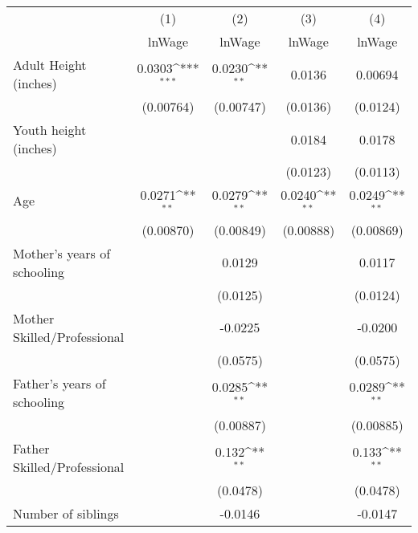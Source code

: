 {
\def\sym#1{\ifmmode^{#1}\else\(^{#1}\)\fi}
\begin{tabular}{l*{4}{c}}
\hline\hline
            &\multicolumn{1}{c}{(1)}&\multicolumn{1}{c}{(2)}&\multicolumn{1}{c}{(3)}&\multicolumn{1}{c}{(4)}\\
            &\multicolumn{1}{c}{lnWage}&\multicolumn{1}{c}{lnWage}&\multicolumn{1}{c}{lnWage}&\multicolumn{1}{c}{lnWage}\\
\hline
Adult Height (inches)&      0.0303\sym{***}&      0.0230\sym{**} &      0.0136         &     0.00694         \\
            &   (0.00764)         &   (0.00747)         &    (0.0136)         &    (0.0124)         \\
[1em]
Youth height (inches)&                     &                     &      0.0184         &      0.0178         \\
            &                     &                     &    (0.0123)         &    (0.0113)         \\
[1em]
Age         &      0.0271\sym{**} &      0.0279\sym{**} &      0.0240\sym{**} &      0.0249\sym{**} \\
            &   (0.00870)         &   (0.00849)         &   (0.00888)         &   (0.00869)         \\
[1em]
Mother's years of schooling&                     &      0.0129         &                     &      0.0117         \\
            &                     &    (0.0125)         &                     &    (0.0124)         \\
[1em]
Mother Skilled/Professional&                     &     -0.0225         &                     &     -0.0200         \\
            &                     &    (0.0575)         &                     &    (0.0575)         \\
[1em]
Father's years of schooling&                     &      0.0285\sym{**} &                     &      0.0289\sym{**} \\
            &                     &   (0.00887)         &                     &   (0.00885)         \\
[1em]
Father Skilled/Professional&                     &       0.132\sym{**} &                     &       0.133\sym{**} \\
            &                     &    (0.0478)         &                     &    (0.0478)         \\
[1em]
Number of siblings&                     &     -0.0146         &                     &     -0.0147         \\

\end{tabular}}
